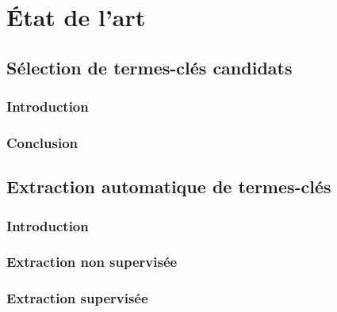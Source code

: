 \part{État de l'art}
\label{part:main-state_of_the_art}


  \chapter{Sélection de termes-clés candidats}
  \label{chap:main-state_of_the_art-keyphrase_candidate_selection}
    \section{Introduction}
    \label{sec:main-state_of_the_art-keyphrase_candidate_selection-introduction}

    \section{Conclusion}
    \label{sec:main-state_of_the_art-keyphrase_candidate_selection-conclusion}


  \chapter{Extraction automatique de termes-clés}
  \label{chap:main-state_of_the_art-automatic_keyphrase_extraction}
    \section{Introduction}
    \label{sec:main-state_of_the_art-automatic_keyphrase_extraction-introduction}

    \section{Extraction non supervisée}
    \label{sec:main-state_of_the_art-automatic_keyphrase_extraction-unsupervised_keyphrase_extraction}

    \section{Extraction supervisée}
    \label{sec:main-state_of_the_art-automatic_keyphrase_extraction-supervised_keyphrase_extraction}

